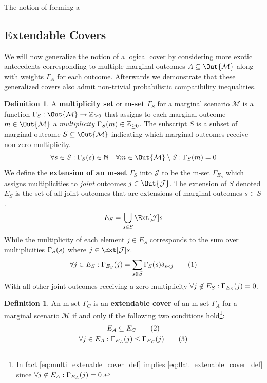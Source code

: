 \documentclass[aps, 10pt, english, twoside, pra, nofootinbib, longbibliography]{revtex4-1}
\theoremstyle{plain}
\theoremstyle{definition}
\newtheorem{definition}[theorem]{Definition}
\theoremstyle{remark}
\newcommand{\ext}{\mathrel{\Yleft}}
\newcommand{\mscenario}{\mathcal{M}}
\newcommand{\jointvar}{\mathcal{J}}
\newcommand{\mext}[1]{E_{#1}}
\newcommand{\mul}[1]{\Gamma_{#1}}
\newcommand{\isext}[2]{\delta_{#1 \ext #2}}
\newcommand{\term}[1]{\textcolor{Mahogany}{\textbf{#1}}}
\begin{document}
    The notion of forming a

    \subsection{Extendable Covers}
    We will now generalize the notion of a logical cover by considering more exotic antecedents corresponding to multiple marginal outcomes $A \subseteq \Out{\mscenario}$ along with weights $\mul{A}$ for each outcome. Afterwards we demonstrate that these generalized covers also admit non-trivial probabilistic compatibility inequalities.

    \begin{definition}
        A \term{multiplicity set} or \term{m-set} $\mul{S}$ for a marginal scenario $\mscenario$ is a function $\mul{S} : \Out{\mscenario} \to \Z_{\geq 0}$ that assigns to each marginal outcome $m \in \Out{\mscenario}$ a \textit{multiplicity} $\mul{S}\br{m} \in \Z_{\geq 0}$. The subscript $S$ is a subset of marginal outcome $S \subseteq \Out{\mscenario}$ indicating which marginal outcomes receive non-zero multiplicity.
        \[ \forall s \in S : \mul{S}\br{s} \in \N  \quad \forall m \in \Out{\mscenario}\setminus S : \mul{S}\br{m} = 0 \]
        We define the \term{extension of an m-set} $\mul{S}$ into $\jointvar$ to be the m-set $\mul{\mext{S}}$ which assigns multiplicities to \textit{joint} outcomes $j \in \Out{\jointvar}$. The extension of $S$ denoted $\mext{S}$ is the set of all joint outcomes that are extensions of marginal outcomes $s \in S$.
        \[ \mext{S} = \bigcup_{s \in S} \Ext[\jointvar]{s} \]
        While the multiplicity of each element $j \in \mext{S}$ corresponds to the sum over multiplicities $\mul{S}\br{s}$ where $j \in \Ext[\jointvar]{s}$.
        \[ \forall j \in \mext{S} : \mul{\mext{S}}\br{j} = \sum_{s \in S} \mul{S}\br{s} \isext{s}{j} \eq \label{eq:joint_multiplicity}\]
        With all other joint outcomes receiving a zero multiplicity $\forall j \not\in \mext{S} : \mul{\mext{S}}\br{j} = 0$.
    \end{definition}
    \begin{definition}
        An m-set $\mul{C}$ is an \term{extendable cover} of an m-set $\mul{A}$ for a marginal scenario $\mscenario$ if and only if the following two conditions hold\footnote{In fact \cref{eq:multi_extenable_cover_def} implies \cref{eq:flat_extenable_cover_def} since $\forall j \not \in \mext{A} : \mul{\mext{A}}\br{j} = 0$.}:
        \begin{gather*}
            E_A \subseteq E_C \eq \label{eq:flat_extenable_cover_def}\\
            \forall j \in E_A : \mul{\mext{A}}\br{j} \leq \mul{\mext{C}}\br{j} \eq \label{eq:multi_extenable_cover_def}
        \end{gather*}
    \end{definition}
\end{document}
